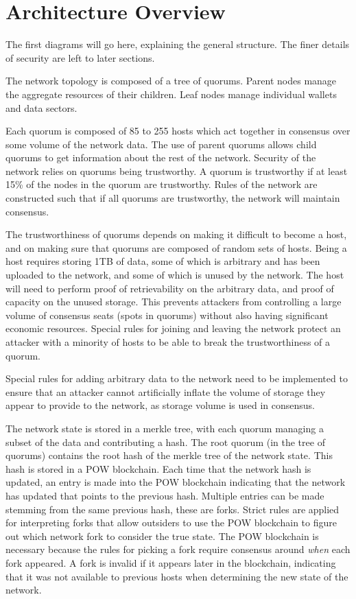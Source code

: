 \documentclass[twocolumn]{article}
\begin{document}
\section{Architecture Overview}
The first diagrams will go here, explaining the general structure.
The finer details of security are left to later sections.

The network topology is composed of a tree of quorums.
Parent nodes manage the aggregate resources of their children.
Leaf nodes manage individual wallets and data sectors.

Each quorum is composed of 85 to 255 hosts which act together in consensus over some volume of the network data.
The use of parent quorums allows child quorums to get information about the rest of the network.
Security of the network relies on quorums being trustworthy.
A quorum is trustworthy if at least 15\% of the nodes in the quorum are trustworthy.
Rules of the network are constructed such that if all quorums are trustworthy, the network will maintain consensus.

The trustworthiness of quorums depends on making it difficult to become a host, and on making sure that quorums are composed of random sets of hosts.
Being a host requires storing 1TB of data, some of which is arbitrary and has been uploaded to the network, and some of which is unused by the network.
The host will need to perform proof of retrievability on the arbitrary data, and proof of capacity on the unused storage.
This prevents attackers from controlling a large volume of consensus seats (spots in quorums) without also having significant economic resources.
Special rules for joining and leaving the network protect an attacker with a minority of hosts to be able to break the trustworthiness of a quorum.

Special rules for adding arbitrary data to the network need to be implemented to ensure that an attacker cannot artificially inflate the volume of storage they appear to provide to the network, as storage volume is used in consensus.

The network state is stored in a merkle tree, with each quorum managing a subset of the data and contributing a hash.
The root quorum (in the tree of quorums) contains the root hash of the merkle tree of the network state.
This hash is stored in a POW blockchain.
Each time that the network hash is updated, an entry is made into the POW blockchain indicating that the network has updated that points to the previous hash.
Multiple entries can be made stemming from the same previous hash, these are forks.
Strict rules are applied for interpreting forks that allow outsiders to use the POW blockchain to figure out which network fork to consider the true state.
The POW blockchain is necessary because the rules for picking a fork require consensus around \textit{when} each fork appeared.
A fork is invalid if it appears later in the blockchain, indicating that it was not available to previous hosts when determining the new state of the network.
\end{document}
